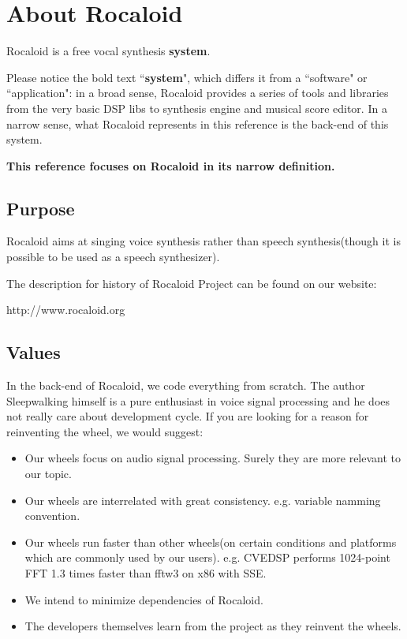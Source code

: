 \section{About Rocaloid}\indent

        Rocaloid is a free vocal synthesis \textbf{system}.
        
        Please notice the bold text ``\textbf{system}", which differs it from a ``software" or ``application": in a broad sense, Rocaloid provides a series of tools and libraries from the very basic DSP libs to synthesis engine and musical score editor. In a narrow sense, what Rocaloid represents in this reference is the back-end of this system.
        
        \bigskip
        
        \textbf{This reference focuses on Rocaloid in its narrow definition.}
        
        \bigskip

\subsection{Purpose}\indent

        Rocaloid aims at singing voice synthesis rather than speech synthesis(though it is possible to be used as a speech synthesizer).
        
        The description for history of Rocaloid Project can be found on our website:
        
        http://www.rocaloid.org
        
\subsection{Values}\indent

        In the back-end of Rocaloid, we code everything from scratch. The author Sleepwalking himself is a pure enthusiast in voice signal processing and he does not really care about development cycle. If you are looking for a reason for reinventing the wheel, we would suggest:
        
        \begin{itemize}
                \item Our wheels focus on audio signal processing. Surely they are more relevant to our topic.
                \item Our wheels are interrelated with great consistency. e.g. variable namming convention.
                \item Our wheels run faster than other wheels(on certain conditions and platforms which are commonly used by our users). e.g. CVEDSP performs 1024-point FFT 1.3 times faster than fftw3 on x86 with SSE.
                \item We intend to minimize dependencies of Rocaloid.
                \item The developers themselves learn from the project as they reinvent the wheels.
        \end{itemize}

